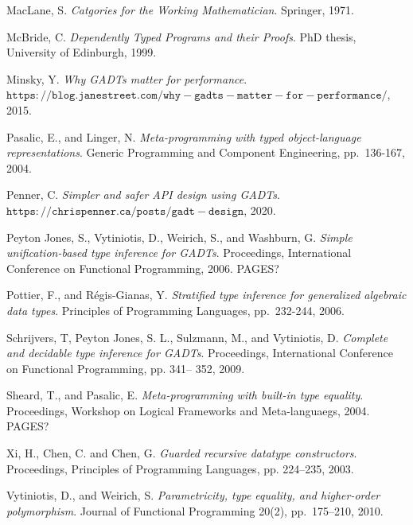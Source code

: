 \documentclass[9pt]{entcs}
\begin{document}
\begin{thebibliography}{10}
 MacLane, S. {\em Catgories for the Working
  Mathematician}. Springer, 1971.

 McBride, C. {\em Dependently Typed Programs and their
  Proofs}. PhD thesis, University of Edinburgh, 1999.

 Minsky, Y.  {\em Why {GADT}s matter for performance}.
  $\mathtt{https://blog.janestreet.com/why-gadts-matter-for-performance/}$,
  2015.

 Pasalic, E., and Linger, N.  {\em Meta-programming with
  typed object-language representations}.  Generic Programming and
  Component Engineering, pp.~136-167, 2004.

 Penner, C.  {\em Simpler and safer {API} design using
  {GADT}s}.  $\mathtt{https://chrispenner.ca/posts/gadt-design}$,
  2020.

 Peyton Jones, S., Vytiniotis, D., Weirich, S., and
  Washburn, G. {\em Simple unification-based type inference for
    GADTs}. Proceedings, International Conference on Functional
  Programming, 2006. {\color{red} PAGES?}

 Pottier, F., and R{\'e}gis-Gianas, Y.  {\em Stratified
  type inference for generalized algebraic data types}.  Principles of
  Programming Languages, pp.~232-244, 2006.

 Schrijvers, T, Peyton Jones, S. L., Sulzmann, M., and
  Vytiniotis, D. {\em Complete and decidable type inference for
    GADTs}. Proceedings, International Conference on Functional
  Programming, pp. 341– 352, 2009.

 Sheard, T., and Pasalic, E. {\em Meta-programming with
  built-in type equality}. Proceedings, Workshop on Logical Frameworks
  and Meta-languaegs, 2004. {\color{red} PAGES?}

 Xi, H., Chen, C. and Chen, G. {\em Guarded recursive
  datatype constructors}. Proceedings, Principles of Programming
  Languages, pp. 224–235, 2003.

 Vytiniotis, D., and Weirich, S.  {\em Parametricity,
  type equality, and higher-order polymorphism}.  Journal of
  Functional Programming 20(2), pp.~175--210, 2010.

\end{thebibliography}
\end{document}
